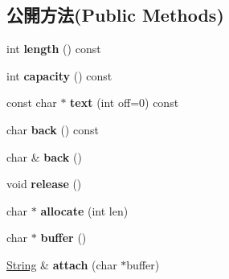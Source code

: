 \subsection*{公開方法(Public Methods)}
\begin{DoxyCompactItemize}
\item 
int {\bfseries length} () const \hypertarget{class_magnum_1_1_string_a95e2c755f8c52acb806208bd6d8b4ad1}{}\label{class_magnum_1_1_string_a95e2c755f8c52acb806208bd6d8b4ad1}

\item 
int {\bfseries capacity} () const \hypertarget{class_magnum_1_1_string_a13bda33c5eb12f7439825e1a487bb33c}{}\label{class_magnum_1_1_string_a13bda33c5eb12f7439825e1a487bb33c}

\item 
const char $\ast$ {\bfseries text} (int off=0) const \hypertarget{class_magnum_1_1_string_a7f8ee81d4cfb09a1712c4983dc017f04}{}\label{class_magnum_1_1_string_a7f8ee81d4cfb09a1712c4983dc017f04}

\item 
char {\bfseries back} () const \hypertarget{class_magnum_1_1_string_adb00060f2043c5efab6df3d1a964f9ad}{}\label{class_magnum_1_1_string_adb00060f2043c5efab6df3d1a964f9ad}

\item 
char \& {\bfseries back} ()\hypertarget{class_magnum_1_1_string_abb80e1189595b12b7466d7e38bde3b7c}{}\label{class_magnum_1_1_string_abb80e1189595b12b7466d7e38bde3b7c}

\item 
void {\bfseries release} ()\hypertarget{class_magnum_1_1_string_a43f7872d2ca7c8cd9c324660afd515d3}{}\label{class_magnum_1_1_string_a43f7872d2ca7c8cd9c324660afd515d3}

\item 
char $\ast$ {\bfseries allocate} (int len)\hypertarget{class_magnum_1_1_string_a0df26a4f4cb9975ce4b5d8a478964359}{}\label{class_magnum_1_1_string_a0df26a4f4cb9975ce4b5d8a478964359}

\item 
char $\ast$ {\bfseries buffer} ()\hypertarget{class_magnum_1_1_string_ae93ccdf5a30ab8437472ff754427e6dd}{}\label{class_magnum_1_1_string_ae93ccdf5a30ab8437472ff754427e6dd}

\item 
\hyperlink{class_magnum_1_1_string}{String} \& {\bfseries attach} (char $\ast$buffer)\hypertarget{class_magnum_1_1_string_a9cc5f31feb19a3b9813926a769d1da99}{}\label{class_magnum_1_1_string_a9cc5f31feb19a3b9813926a769d1da99}


\end{DoxyCompactItemize}
